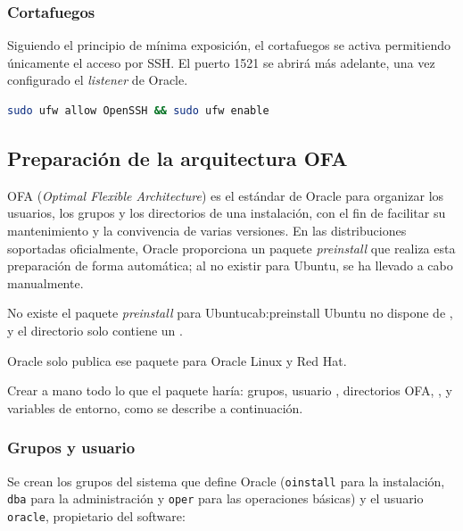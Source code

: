 \subsubsection{Cortafuegos}

Siguiendo el principio de mínima exposición, el cortafuegos se activa permitiendo únicamente el acceso por SSH. El puerto 1521 se abrirá más adelante, una vez configurado el \textit{listener} de Oracle.

\begin{lstlisting}[language=bash]
sudo ufw allow OpenSSH && sudo ufw enable
\end{lstlisting}

\subsection{Preparación de la arquitectura OFA}

OFA (\textit{Optimal Flexible Architecture}) es el estándar de Oracle para organizar los usuarios, los grupos y los directorios de una instalación, con el fin de facilitar su mantenimiento y la convivencia de varias versiones. En las distribuciones soportadas oficialmente, Oracle proporciona un paquete \textit{preinstall} que realiza esta preparación de forma automática; al no existir para Ubuntu, se ha llevado a cabo manualmente.

\begin{cabezazo}{No existe el paquete \textit{preinstall} para Ubuntu}{cab:preinstall}
\problema Ubuntu no dispone de , y el
directorio  solo contiene un .

\causa Oracle solo publica ese paquete para Oracle Linux y Red Hat.

\solucion Crear a mano todo lo que el paquete haría: grupos, usuario
, directorios OFA, ,
 y variables de entorno, como se
describe a continuación.
\end{cabezazo}

\subsubsection{Grupos y usuario}

Se crean los grupos del sistema que define Oracle (\texttt{oinstall} para la instalación, \texttt{dba} para la administración y \texttt{oper} para las operaciones básicas) y el usuario \texttt{oracle}, propietario del software:

